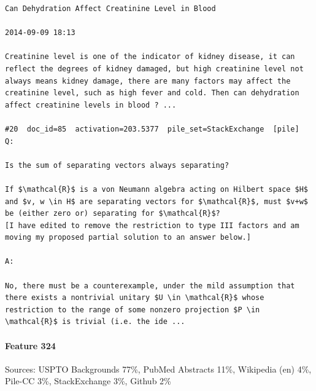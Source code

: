 \begin{verbatim}
Can Dehydration Affect Creatinine Level in Blood

2014-09-09 18:13

Creatinine level is one of the indicator of kidney disease, it can reflect the degrees of kidney damaged, but high creatinine level not always means kidney damage, there are many factors may affect the creatinine level, such as high fever and cold. Then can dehydration affect creatinine levels in blood ? ...

#20  doc_id=85  activation=203.5377  pile_set=StackExchange  [pile]
Q:

Is the sum of separating vectors always separating?

If $\mathcal{R}$ is a von Neumann algebra acting on Hilbert space $H$ and $v, w \in H$ are separating vectors for $\mathcal{R}$, must $v+w$ be (either zero or) separating for $\mathcal{R}$?
[I have edited to remove the restriction to type III factors and am moving my proposed partial solution to an answer below.]

A:

No, there must be a counterexample, under the mild assumption that there exists a nontrivial unitary $U \in \mathcal{R}$ whose restriction to the range of some nonzero projection $P \in \mathcal{R}$ is trivial (i.e. the ide ...

\end{verbatim}

\paragraph*{Feature 324} Sources: USPTO Backgrounds 77\%, PubMed Abstracts 11\%, Wikipedia (en) 4\%, Pile-CC 3\%, StackExchange 3\%, Github 2\%

